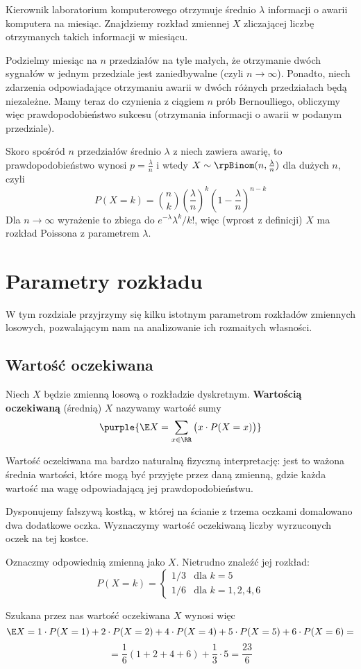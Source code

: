 \begin{example}
    Kierownik laboratorium komputerowego otrzymuje średnio $\lambda$ informacji o awarii komputera na miesiąc. Znajdziemy rozkład zmiennej $X$ zliczającej liczbę otrzymanych takich informacji w miesiącu.

    Podzielmy miesiąc na $n$ przedziałów na tyle małych, że otrzymanie dwóch sygnałów w jednym przedziale jest zaniedbywalne (czyli $n\to\infty$). Ponadto, niech zdarzenia odpowiadające otrzymaniu awarii w dwóch różnych przedziałach będą niezależne. Mamy teraz do czynienia z ciągiem $n$ prób Bernoulliego, obliczymy więc prawdopodobieństwo sukcesu (otrzymania informacji o awarii w podanym przedziale).

    Skoro spośród $n$ przedziałów średnio $\lambda$ z niech zawiera awarię, to prawdopodobieństwo wynosi $p = \frac{\lambda}{n}$ i wtedy $X \sim \rpBinom(n,\frac{\lambda}{n})$ dla dużych $n$, czyli
    $$P(X = k) = \binom{n}{k}\left(\frac{\lambda}{n}\right)^k\left(1-\frac{\lambda}{n}\right)^{n-k}$$
    Dla $n \to \infty$ wyrażenie to zbiega do $e^{-\lambda}\lambda^k/k!$, więc (wprost z definicji) $X$ ma rozkład Poissona z parametrem $\lambda$.
\end{example}

\section{Parametry rozkładu}

W tym rozdziale przyjrzymy się kilku istotnym parametrom rozkładów zmiennych losowych, pozwalającym nam na analizowanie ich rozmaitych własności.

\subsection{Wartość oczekiwana}

Niech $X$ będzie zmienną losową o rozkładzie dyskretnym. \textbf{Wartością oczekiwaną} (średnią) $X$ nazywamy wartość sumy
$$
\purple{\E X = \sum_{x\in\RR} \big(x \cdot P(X = x)\big)}
$$

Wartość oczekiwana ma bardzo naturalną fizyczną interpretację: jest to ważona średnia wartości, które mogą być przyjęte przez daną zmienną, gdzie każda wartość ma wagę odpowiadającą jej prawdopodobieństwu.

\begin{example}
    Dysponujemy fałszywą kostką, w której na ścianie z trzema oczkami domalowano dwa dodatkowe oczka. Wyznaczymy wartość oczekiwaną liczby wyrzuconych oczek na tej kostce.

    Oznaczmy odpowiednią zmienną jako $X$. Nietrudno znaleźć jej rozkład:
    $$P(X = k) = \begin{cases}
        1/3 & \text{dla } k = 5 \\
        1/6 & \text{dla } k = 1, 2, 4, 6
    \end{cases}$$

    Szukana przez nas wartość oczekiwana $X$ wynosi więc
    $$\E X = 1 \cdot P(X = 1) + 2 \cdot P(X = 2) + 4 \cdot P(X = 4) + 5 \cdot P(X = 5) + 6 \cdot P(X = 6) =$$ $$= \frac{1}{6}(1 + 2 + 4 + 6) + \frac{1}{3} \cdot 5 = \frac{23}{6}$$
\end{example}

